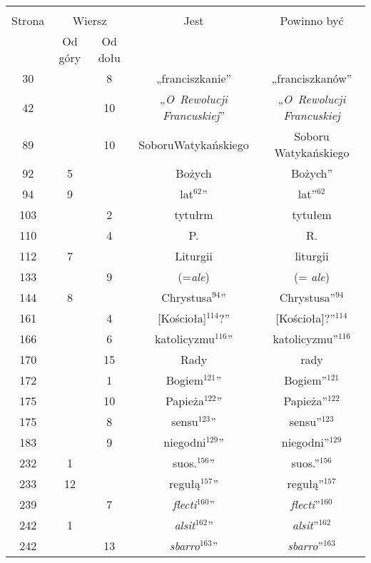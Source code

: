 \documentclass[a4paper,11pt]{article}
\begin{document}
\begin{center}

  \begin{tabular}{|c|c|c|c|c|}
    \hline
    & \multicolumn{2}{c|}{} & & \\
    Strona & \multicolumn{2}{c|}{Wiersz} & Jest
                              & Powinno być \\ \cline{2-3}
    & Od góry & Od dołu & & \\
    \hline
    30  & &  8 & „franciszkanie” & „franciszkanów” \\
    42  & & 10 & „\textit{O~Rewolucji Francuskiej}”
           & „\textit{O~Rewolucji Francuskiej} \\
    89  & & 10 & SoboruWatykańskiego & Soboru Watykańskiego \\
    92  &  5 & & Bożych & Bożych” \\
    94  &  9 & & lat$^{ 62 }$” & lat”$^{ 62 }$ \\
    103 & &  2 & tytułrm & tytułem \\
    110 & &  4 & P. & R. \\
    112 &  7 & & Liturgii & liturgii \\
    133 & &  9 & (=\textit{ale}) & (= \textit{ale}) \\
    144 &  8 & & Chrystusa$^{ 94 }$” & Chrystusa”$^{ 94 }$\\
    161 & &  4 & [Kościoła]$^{ 114 }$?” & [Kościoła]?”$^{ 114 }$ \\
    166 & &  6 & katolicyzmu$^{ 116 }$” & katolicyzmu”$^{ 116 }$ \\
    170 & & 15 & Rady & rady \\
    172 & &  1 & Bogiem$^{ 121 }$” & Bogiem”$^{ 121 }$ \\
    175 & & 10 & Papieża$^{ 122 }$” & Papieża”$^{ 122 }$ \\
    175 & &  8 & sensu$^{ 123 }$” & sensu”$^{ 123 }$ \\
    183 & &  9 & niegodni$^{ 129 }$” & niegodni”$^{ 129 }$ \\
    232 &  1 & & suos.$^{ 156 }$” & suos.”$^{ 156 }$ \\
    233 & 12 & & regułą$^{ 157 }$” & regułą”$^{ 157 }$ \\
    239 & &  7 & \textit{flecti}$^{ 160 }$” & \textit{flecti}”$^{ 160 }$ \\
    242 &  1 & & \textit{alsit}$^{ 162 }$” & \textit{alsit}”$^{ 162 }$ \\
    242 & & 13 & \textit{sbarro}$^{ 163 }$” & \textit{sbarro}”$^{ 163 }$ \\

\end{tabular}
\end{center}
\end{document}
